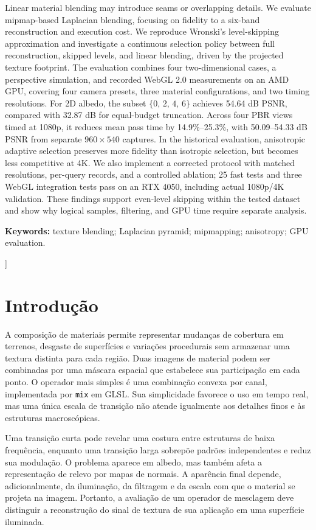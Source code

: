 \begin{minipage}{0.94\textwidth}
Linear material blending may introduce seams or overlapping details. We evaluate mipmap-based Laplacian blending, focusing on fidelity to a six-band reconstruction and execution cost. We reproduce Wronski's level-skipping approximation and investigate a continuous selection policy between full reconstruction, skipped levels, and linear blending, driven by the projected texture footprint. The evaluation combines four two-dimensional cases, a perspective simulation, and recorded WebGL 2.0 measurements on an AMD GPU, covering four camera presets, three material configurations, and two timing resolutions. For 2D albedo, the subset $\{0,\,2,\,4,\,6\}$ achieves 54.64 dB PSNR, compared with 32.87 dB for equal-budget truncation. Across four PBR views timed at 1080p, it reduces mean pass time by 14.9\%--25.3\%, with 50.09--54.33 dB PSNR from separate $960\times540$ captures. In the historical evaluation, anisotropic adaptive selection preserves more fidelity than isotropic selection, but becomes less competitive at 4K. We also implement a corrected protocol with matched resolutions, per-query records, and a controlled ablation; 25 fast tests and three WebGL integration tests pass on an RTX 4050, including actual 1080p/4K validation. These findings support even-level skipping within the tested dataset and show why logical samples, filtering, and GPU time require separate analysis.
\par\vspace{3pt}
\noindent\textbf{Keywords:} texture blending; Laplacian pyramid; mipmapping; anisotropy; GPU evaluation.
\end{minipage}\vspace{8pt}
]

\section{Introdução}
A composição de materiais permite representar mudanças de cobertura em terrenos, desgaste de superfícies e variações procedurais sem armazenar uma textura distinta para cada região. Duas imagens de material podem ser combinadas por uma máscara espacial que estabelece sua participação em cada ponto. O operador mais simples é uma combinação convexa por canal, implementada por \texttt{mix} em GLSL. Sua simplicidade favorece o uso em tempo real, mas uma única escala de transição não atende igualmente aos detalhes finos e às estruturas macroscópicas.

Uma transição curta pode revelar uma costura entre estruturas de baixa frequência, enquanto uma transição larga sobrepõe padrões independentes e reduz sua modulação. O problema aparece em albedo, mas também afeta a representação de relevo por mapas de normais. A aparência final depende, adicionalmente, da iluminação, da filtragem e da escala com que o material se projeta na imagem. Portanto, a avaliação de um operador de mesclagem deve distinguir a reconstrução do sinal de textura de sua aplicação em uma superfície iluminada.

